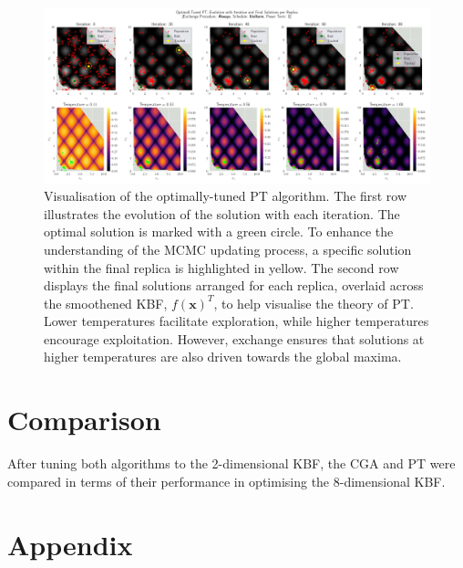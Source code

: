 \documentclass[10pt]{article}
\begin{document}
\begin{figure}[H]
    \centering
    \includegraphics[width=1.1\textwidth]{../figures/Permanent Images/PT_Optimal_Tuning.png}
    \captionsetup{justification=centering}
    \caption{Visualisation of the optimally-tuned PT algorithm. The first row illustrates the evolution of the solution with each iteration. The optimal solution is marked with a green circle. To enhance the understanding of the MCMC updating process, a specific solution within the final replica is highlighted in yellow. The second row displays the final solutions arranged for each replica, overlaid across the smoothened KBF, $f(\mathbf{x})^T$, to help visualise the theory of PT. Lower temperatures facilitate exploration, while higher temperatures encourage exploitation. However, exchange ensures that solutions at higher temperatures are also driven towards the global maxima.}
    \label{fig:PToptimal_evo}
\end{figure}

\section{Comparison}
\label{sec:CGA_QEG_comparison}

After tuning both algorithms to the 2-dimensional KBF, the CGA and PT were compared in terms of their performance in optimising the 8-dimensional KBF.


\newpage
\section{Appendix}
\end{document}
